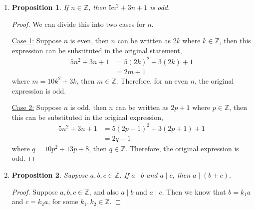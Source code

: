 \documentclass{homework}
\newtheorem*{prop}{Proposition}
\begin{document}
\begin{enumerate}
		\item \begin{minipage}[t]{\linewidth}
			\begin{prop}
				If $n \in \mathbb{Z}$, then $5 n^2 + 3n + 1$ is odd.
			\end{prop}
			\begin{proof}
				We can divide this into two cases for $n$.
				
				\underline{Case 1:} Suppose $n$ is even, then $n$ can be written as $2k$ where $k \in \mathbb{Z}$, then this expression can be substituted in the original statement, \begin{align*}
					5n^2 + 3n + 1 & = 5\left(2k\right)^2 + 3(2k) + 1 \\
						& = 2m + 1
				\end{align*}
				where $m = 10k^2 + 3k$, then $m \in \mathbb{Z}$. Therefore, for an even $n$, the original expression is odd.
				
				\vspace{1em}
				
				\underline{Case 2:} Suppose $n$ is odd, then $n$ can be written as $2p + 1$ where $p \in \mathbb{Z}$, then this can be substituted in the original expression, \begin{align*}
					5n^2 + 3n + 1 & = 5\left(2p + 1\right)^2 + 3(2p + 1) + 1 \\
						& = 2q + 1
				\end{align*}
				where $q = 10p^2 + 13p + 8$, then $q \in \mathbb{Z}$. Therefore, the original expression is odd.
			\end{proof}
		\end{minipage}
	
	
		\item \begin{minipage}[t]{\linewidth}
			\begin{prop}
				Suppose $a, b, c \in \mathbb{Z}$. If $a \mid b$ and $a \mid c$, then $a \mid \left(b+c\right)$.
			\end{prop}
			\begin{proof}
				Suppose $a, b, c \in \mathbb{Z}$, and also $a \mid b$ and $a \mid c$. Then we know that $b = k_1 a$ and  $c = k_2 a$, for some $k_1, k_2 \in \mathbb{Z}$.
				

\end{proof}
\end{minipage}
\end{enumerate}
\end{document}
